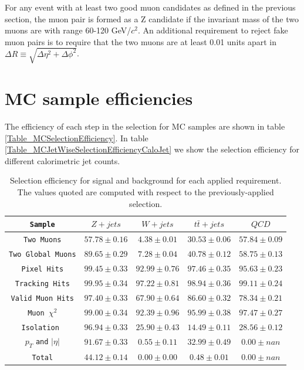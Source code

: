 \documentclass[10pt,a4paper,onecolumn]{article}
\begin{document}
For any event with at least two good muon candidates as defined in the previous section, the muon pair is formed as a Z candidate if
the invariant mass of the two muons are with range 60-120 GeV/$c^2$.  An additional requirement to reject fake muon pairs is to require
that the two muons are at least 0.01 units apart in $\Delta R \equiv \sqrt{\Delta\eta^2 + \Delta\phi^2}$.

\section{MC sample efficiencies}

The efficiency of each step in the selection for MC samples are shown in table \ref{Table_MCSelectionEfficiency}.
In table \ref{Table_MCJetWiseSelectionEfficiencyCaloJet} we show the selection efficiency for different calorimetric jet counts.

\begin{table}[htdp]
 \caption{Selection efficiency for signal and background for each
    applied requirement. The values quoted are computed with respect
    to the previously-applied selection.\label{tab:effSel}}
 \centering
 \begin{tabular}{|c|c|c|c|c|}
   \hline
   \verb|Sample| & $Z+jets$ & $W+jets$ & $t \bar t+jets$ & $QCD$ \\
   \hline
   \verb|Two Muons|          & $ 57.78 \pm 0.16 $ & $ 4.38 \pm 0.01 $ & $ 30.53 \pm 0.06 $ & $ 57.84 \pm 0.09 $ \\
   \verb|Two Global Muons|   & $ 89.65 \pm 0.29 $ & $ 7.28 \pm 0.04 $ & $ 40.78 \pm 0.12 $ & $ 58.75 \pm 0.13 $ \\
   \verb|Pixel Hits|         & $ 99.45 \pm 0.33 $ & $ 92.99 \pm 0.76 $ & $ 97.46 \pm 0.35 $ & $ 95.63 \pm 0.23 $ \\
   \verb|Tracking Hits|      & $ 99.95 \pm 0.34 $ & $ 97.22 \pm 0.81$ & $ 98.94 \pm 0.36 $ & $ 99.11 \pm 0.24 $ \\
   \verb|Valid Muon Hits|    & $ 97.40 \pm 0.33 $ & $ 67.90 \pm 0.64 $ & $ 86.60 \pm 0.32 $ & $ 78.34 \pm 0.21 $ \\
   \verb|Muon |$\chi^2$      & $ 99.00 \pm 0.34 $ & $ 92.39 \pm 0.96 $ & $ 95.99 \pm 0.38 $ & $ 97.47 \pm 0.27 $ \\
   \verb|Isolation |         & $ 96.94 \pm 0.33 $ & $ 25.90 \pm 0.43$ & $ 14.49 \pm 0.11 $ & $ 28.56 \pm 0.12 $ \\
   $p_T$ \verb|and| $|\eta|$ & $ 91.67 \pm 0.33 $ & $ 0.55 \pm 0.11 $ & $ 32.99 \pm 0.49 $ & $ 0.00 \pm nan $ \\
   \hline
   \verb|Total|              & $ 44.12 \pm 0.14 $ & $ 0.00 \pm 0.00 $ & $ 0.48 \pm 0.01 $ & $ 0.00 \pm nan $ \\
   \hline
   \end{tabular}
\label{table}
\end{table}
\end{document}
